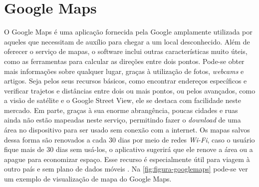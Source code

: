 \section{Google Maps}


O Google Maps é uma aplicação fornecida pela Google amplamente utilizada por aqueles que necessitam de auxílio para chegar a um local desconhecido. Além de oferecer o serviço de mapas, o software inclui outras características muito úteis, como as ferramentas para calcular as direções entre dois pontos. Pode-se obter mais informações sobre qualquer lugar, graças à utilização de fotos, \textit{webcams} e artigos. Seja pelos seus recursos básicos, como encontrar endereços específicos e verificar trajetos e distâncias entre dois ou mais pontos, ou pelos avançados, como a visão de satélite e o Google Street View, ele se destaca com facilidade neste mercado. Em parte, graças à sua enorme abrangência, poucas cidades e ruas ainda não estão mapeadas neste serviço, permitindo fazer o \textit{download} de uma área no dispositivo para ser usado sem conexão com a internet. Os mapas salvos dessa forma são renovados a cada 30 dias por meio de redes \textit{Wi-Fi}, caso o usuário fique mais de 30 dias sem usá-los, o aplicativo sugerirá que ele renove a área ou a apague para economizar espaço. Esse recurso é especialmente útil para viagem à outro país e sem plano de dados móveis \cite{google:2019}. Na \autoref{fig:figura-googlemaps} pode-se ver um exemplo de visualização de mapa do Google Maps.

